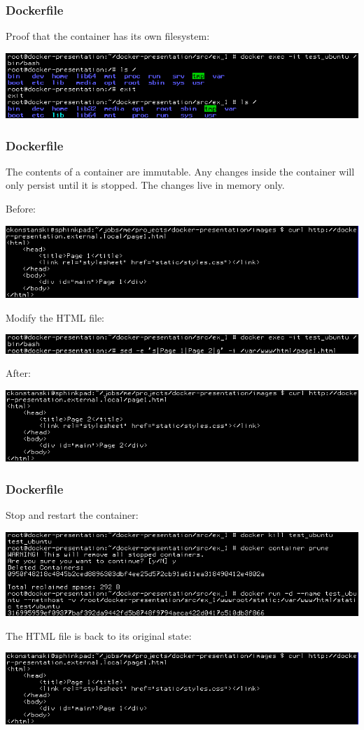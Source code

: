 \documentclass[helvetica,english,utf8,notitle,nologo]{beamer}
\begin{document}
\begin{frame}
  \frametitle{Dockerfile}

  Proof that the container has its own filesystem:

  \includegraphics[scale=0.44]{image_11}
\end{frame}

\begin{frame}
  \frametitle{Dockerfile}

  The contents of a container are immutable. Any changes inside the
  container will only persist until it is stopped. The changes live in
  memory only.

  Before:

  \includegraphics[scale=0.44]{image_12}

  Modify the HTML file:

  \includegraphics[scale=0.44]{image_14}

  After:

  \includegraphics[scale=0.44]{image_13}
\end{frame}

\begin{frame}
  \frametitle{Dockerfile}

  Stop and restart the container:

  \includegraphics[scale=0.44]{image_15}

  The HTML file is back to its original state:

  \includegraphics[scale=0.44]{image_16}
\end{frame}
\end{document}
